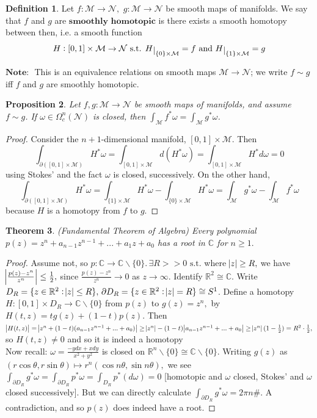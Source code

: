 \documentclass[10pt]{article}
\theoremstyle{plain}
\newtheorem{thm}{Theorem}[section] %
\newtheorem{prop}[thm]{Proposition}
\theoremstyle{definition}
\newtheorem{defn}[thm]{Definition} %
\newcommand{\myand}{\text{ and }}
\newcommand{\st}{\text{ s.t. }}
\newcommand{\Note}{\textbf{Note: }}
\newcommand{\Real}{\mathbb{R}}
\newcommand{\man}{\mathcal{M}}
\newcommand{\nan}{\mathcal{N}}
\newcommand{\compactpformnan}[1]{\Omega^{#1}_c(\nan)}
\newcommand{\dx}{dx}
\newcommand{\deriv}{d}
\newcommand{\dw}{d\omega}
\def\restrict#1{\raise-.5ex\hbox{\ensuremath|}_{#1}}
\newcommand{\mysection}[1]{
    \setcounter{thm}{0}
    \section*{#1}
    \addcontentsline{toc}{section}{#1}
    \addtocounter{section}{1}
    \setcounter{subsection}{0}

}
\begin{document}
\begin{defn}
Let $f : \man \to \nan,$ $g:\man \to \nan$ be smooth maps of manifolds. We say that $f$ and $g$ are $\textbf{smoothly homotopic}$ is there exists a smooth homotopy between then, i.e. a smooth function 
$$H: [0,1] \times \man \to \nan \st H\restrict{\{0\} \times \man} = f \myand H\restrict{\{1\} \times\man} = g$$

\end{defn}
$\Note$ This is an equivalence relations on smooth maps $\man \to \nan$; we write $f \sim g$ iff $f$ and $g$ are smoothly homotopic.
\begin{prop}\label{prop:HomotopyInvarianceOfIntegral}
Let $f,g : \man \to \nan$ be smooth maps of manifolds, and assume $f\sim g$. If $\omega \in \compactpformnan{n}$ is closed, then $\int_\man f ^* \omega = \int_\man g^* \omega$.
\end{prop}
\begin{proof}
Consider the $n+1$-dimensional manifold, $[0,1]\times \man$. Then 
$$\int_{\partial ([0,1]\times \man)} H^*\omega = \int_{[0,1]\times \man} \deriv ( H^* \omega) = \int_{[0,1]\times\man} H^*\dw = 0$$
using Stokes' and the fact $\omega$ is closed, successively. On the other hand,
$$\int_{\partial ([0,1]\times \man)} H^* \omega = \int_{\{1\}\times \man} H^*\omega - \int_{\{0\}\times \man} H^*\omega = \int_\man g^*\omega - \int_\man f^* \omega$$
because $H$ is a homotopy from $f$ to $g$.
\end{proof}
\begin{thm}
(Fundamental Theorem of Algebra) Every polynomial $p(z) = z^n + a_{n-1}z^{n-1} + ... + a_1 z + a_0$ has a root in $\mathbb{C}$ for $n \geq 1.$
\end{thm}
\begin{proof}
Assume not, so $p: \mathbb{C} \to \mathbb{C}\backslash \{0\}.\, \exists R > > 0 \st$where $\abs{z} \geq R,$ we have $\abs{\frac{p(z)-z^n}{z^n}}\leq \frac{1}{2},$ since $\frac{p(z) - z^n}{z^n} \to 0$ as $z\to \infty.$ Identify $\Real^2 \cong \mathbb{C}$. Write $D_R = \{z\in \Real^2 : \abs{z} \leq R\},\, \partial D_R = \{z\in \Real^2 : \abs{z} = R\}\cong S^1$. Define a homotopy $H : [0,1] \times D_R \to \mathbb{C}\backslash\{0\}$ from $p(z)$ to $g(z) = z^n,$ by $H(t,z) = tg(z) + (1-t)p(z).$ Then $\abs{H(t,z)} = \abs{z^n +(1-t)(a_{n-1}z^{n-1} +...+a_0)}\geq \abs{z^n} -(1-t)\abs{a_{n-1}z^{n-1} + ... + a_0} \geq \abs{z^n}(1-\frac{1}{2}) = R^2 \cdot \frac{1}{2},$ so $H(t,z) \neq 0$ and so it is indeed a homotopy\\
Now recall: $\omega = \frac{-y \dx +x dy}{x^2+y^2}$ is closed on $\Real^n\backslash \{0\} \cong \mathbb{C}\backslash \{0\}.$ Writing $g(z)$ as $(r\cos\theta,r\sin\theta) \mapsto r^n (\cos n\theta,\sin n \theta),$ we see $\int_{\partial D_R} g^* \omega = \int_{\partial D_R} p^* \omega = \int_{D_R} p^*(\dw) = 0$ [homotopic and $\omega$ closed, Stokes' and $\omega$ closed successively]. But we can directly calculate $\int_{\partial D_R} g^*\omega = 2\pi n \#$. A contradiction, and so $p(z)$ does indeed have a root.
\end{proof}
\end{document}
